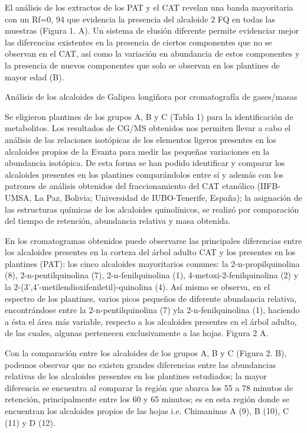 \documentclass{article}
\begin{document}
El análisis de los extractos de los PAT y el CAT revelan una banda mayoritaria
con un Rf=0, 94 que evidencia la presencia del alcaloide 2 FQ en todas las
muestras (Figura 1. A). Un sistema de elusión diferente permite evidenciar mejor
las diferencias existentes en la presencia de ciertos componentes que no se
observan en el CAT, así como la variación en abundancia de estos componentes y
la presencia de nuevos componentes que solo se observan en los plantines de
mayor edad (B).

Análisis de los alcaloides de Galipea longiñora por cromatografía de gases/masas

Se eligieron plantines de los grupos A, B y C (Tabla 1) para la identificación
de metabolitos. Los resultados de CG/MS obtenidos nos permiten llevar a cabo el
análisis de las relaciones isotópicas de los elementos ligeros presentes en los
alcaloides propios de la Evanta para medir las pequeñas variaciones en la
abundancia isotópica. De esta forma se han podido identificar y comparar los
alcaloides presentes en los plantines comparándolos entre sí y además con los
patrones de análisis obtenidos del fraccionamiento del CAT etanólico (IIFB-UMSA,
La Paz, Bolivia; Universidad de IUBO-Tenerife, España); la asignación de las
estructuras químicas de los alcaloides quinolínicos, se realizó por comparación
del tiempo de retención, abundancia relativa y masa obtenida.

En los cromatogramas obtenidos puede observarse las principales diferencias
entre los alcaloides presentes en la corteza del árbol adulto CAT y los
presentes en los plantines (PAT): los cinco alcaloides mayoritarios comunes: la
2-n-propilquinolina (8), 2-n-pentilquinolina (7), 2-n-fenilquinolina (1),
4-metoxi-2-fenilquinolina (2) y la 2-(3',4'-metilendioxifeniletil)-quinolina
(4). Así mismo se observa, en el espectro de los plantines, varios picos
pequeños de diferente abundancia relativa, encontrándose entre la
2-n-pentilquinolina (7) yla 2-n-fenilquinolina (1), haciendo a ésta el área más
variable, respecto a los alcaloides presentes en el árbol adulto, de las cuales,
algunas pertenecen exclusivamente a las hojas. Figura 2 A.

\begin{Center}
\end{Center}

Con la comparación entre los alcaloides de los grupos A, B y C (Figura 2. B),
podemos observar que no existen grandes diferencias entre las abundancias
relativas de los alcaloides presentes en los plantines estudiados; la mayor
diferencia se encuentra al comparar la región que abarca los 55 a 78 minutos de
retención, principalmente entre los 60 y 65 minutos; es en esta región donde se
encuentran los alcaloides propios de las hojas i.e. Chimaninas A (9), B (10), C
(11) y D (12).
\end{document}

